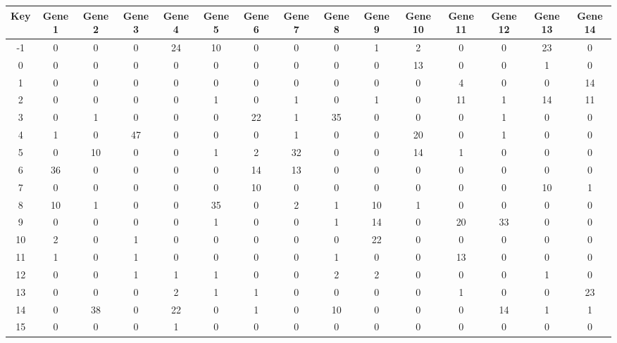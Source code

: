 \begin{tabular}{|c|c|c|c|c|c|c|c|c|c|c|c|c|c|c|}
\hline
Key & Gene 1 & Gene 2 & Gene 3 & Gene 4 & Gene 5 & Gene 6 & Gene 7 & Gene 8 & Gene 9 & Gene 10 & Gene 11 & Gene 12 & Gene 13 & Gene 14 \\
\hline
-1 & 0 & 0 & 0 & 24 & 10 & 0 & 0 & 0 & 1 & 2 & 0 & 0 & 23 & 0 \\
0 & 0 & 0 & 0 & 0 & 0 & 0 & 0 & 0 & 0 & 13 & 0 & 0 & 1 & 0 \\
1 & 0 & 0 & 0 & 0 & 0 & 0 & 0 & 0 & 0 & 0 & 4 & 0 & 0 & 14 \\
2 & 0 & 0 & 0 & 0 & 1 & 0 & 1 & 0 & 1 & 0 & 11 & 1 & 14 & 11 \\
3 & 0 & 1 & 0 & 0 & 0 & 22 & 1 & 35 & 0 & 0 & 0 & 1 & 0 & 0 \\
4 & 1 & 0 & 47 & 0 & 0 & 0 & 1 & 0 & 0 & 20 & 0 & 1 & 0 & 0 \\
5 & 0 & 10 & 0 & 0 & 1 & 2 & 32 & 0 & 0 & 14 & 1 & 0 & 0 & 0 \\
6 & 36 & 0 & 0 & 0 & 0 & 14 & 13 & 0 & 0 & 0 & 0 & 0 & 0 & 0 \\
7 & 0 & 0 & 0 & 0 & 0 & 10 & 0 & 0 & 0 & 0 & 0 & 0 & 10 & 1 \\
8 & 10 & 1 & 0 & 0 & 35 & 0 & 2 & 1 & 10 & 1 & 0 & 0 & 0 & 0 \\
9 & 0 & 0 & 0 & 0 & 1 & 0 & 0 & 1 & 14 & 0 & 20 & 33 & 0 & 0 \\
10 & 2 & 0 & 1 & 0 & 0 & 0 & 0 & 0 & 22 & 0 & 0 & 0 & 0 & 0 \\
11 & 1 & 0 & 1 & 0 & 0 & 0 & 0 & 1 & 0 & 0 & 13 & 0 & 0 & 0 \\
12 & 0 & 0 & 1 & 1 & 1 & 0 & 0 & 2 & 2 & 0 & 0 & 0 & 1 & 0 \\
13 & 0 & 0 & 0 & 2 & 1 & 1 & 0 & 0 & 0 & 0 & 1 & 0 & 0 & 23 \\
14 & 0 & 38 & 0 & 22 & 0 & 1 & 0 & 10 & 0 & 0 & 0 & 14 & 1 & 1 \\
15 & 0 & 0 & 0 & 1 & 0 & 0 & 0 & 0 & 0 & 0 & 0 & 0 & 0 & 0 \\
\hline
\end{tabular}